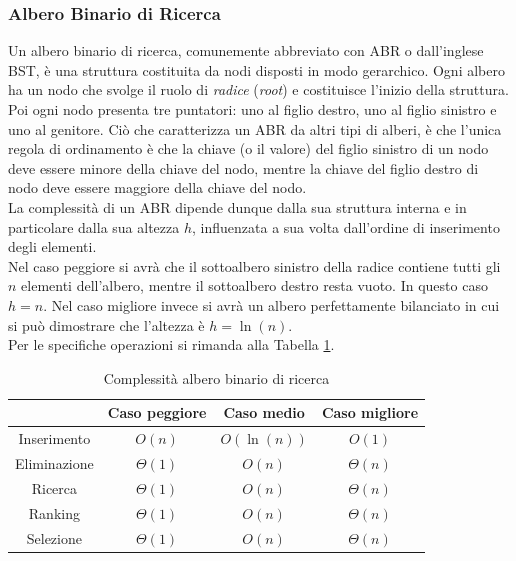 \subsubsection*{Albero Binario di Ricerca}
Un albero binario di ricerca, comunemente abbreviato con ABR o dall'inglese BST, è una struttura costituita da nodi disposti in modo gerarchico. Ogni albero ha un nodo che svolge il ruolo di \textit{radice} (\textit{root}) e costituisce l'inizio della struttura. Poi ogni nodo presenta tre puntatori: uno al figlio destro, uno al figlio sinistro e uno al genitore. Ciò che caratterizza un ABR da altri tipi di alberi, è che l'unica regola di ordinamento è che la chiave (o il valore) del figlio sinistro di un nodo deve essere minore della chiave del nodo, mentre la chiave del figlio destro di nodo deve essere maggiore della chiave del nodo.\\
La complessità di un ABR dipende dunque dalla sua struttura interna e in particolare dalla sua altezza $h$, influenzata a sua volta dall'ordine di inserimento degli elementi.\\
Nel caso peggiore si avrà che il sottoalbero sinistro della radice contiene tutti gli $n$ elementi dell'albero, mentre il sottoalbero destro resta vuoto. In questo caso $h = n$. Nel caso migliore invece si avrà un albero perfettamente bilanciato in cui si può dimostrare che l'altezza è $h = \ln(n)$.\\
Per le specifiche operazioni si rimanda alla Tabella \ref{tab:complessita_albero_binario_ricerca}.

\begin{table}[h!]
	\centering
	\begin{tabular}{ |c||c|c|c|  }
		\hhline{~---}
		\multicolumn{1}{c|}{} & Caso peggiore & Caso medio & Caso migliore \\
		\hline
		Inserimento & $O(n)$ & $O(\ln(n))$ & $O(1)$\\
		\hline
		Eliminazione & $\Theta(1)$ & $O(n)$ & $\Theta(n)$\\
		\hline
		Ricerca & $\Theta(1)$ & $O(n)$ & $\Theta(n)$\\
		\hline
		Ranking & $\Theta(1)$ & $O(n)$ & $\Theta(n)$\\
		\hline
		Selezione & $\Theta(1)$ & $O(n)$ & $\Theta(n)$\\
		\hline
	\end{tabular}
	\caption{Complessità albero binario di ricerca}
	\label{tab:complessita_albero_binario_ricerca}
\end{table}

